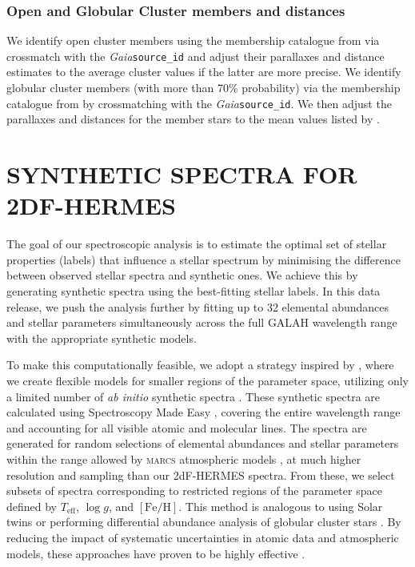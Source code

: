 \documentclass[
  journal=pasa,
  manuscript=research-paper, %
  year=2024,
  volume=37
]{cup-journal}
\newcommand{\Teff}{$T_\mathrm{eff}$\xspace}
\newcommand{\logg}{$\log g$\xspace}
\newcommand{\feh}{$\mathrm{[Fe/H]}$\xspace}
\newcommand{\sme}{\textsc{sme}\xspace}
\newcommand{\marcs}{\textsc{marcs}\xspace}
\newcommand{\Gaia}{\textit{Gaia}\xspace}
\begin{document}
\subsubsection{Open and Globular Cluster members and distances} \label{sec:oc_gc}

We identify open cluster members using the membership catalogue from \citet{CantatGaudin2020} via crossmatch with the \Gaia \texttt{source\_id} and adjust their parallaxes and distance estimates to the average cluster values if the latter are more precise. We identify globular cluster members (with more than 70\% probability) via the membership catalogue from \citet{Vasiliev2021} by crossmatching with the \Gaia \texttt{source\_id}. We then adjust the parallaxes and distances for the member stars to the mean values listed by \citet{Baumgardt2021}.

\section{SYNTHETIC SPECTRA FOR 2DF-HERMES}
\label{sec:synthetic_spectra}

The goal of our spectroscopic analysis is to estimate the optimal set of stellar properties (labels) that influence a stellar spectrum by minimising the difference between observed stellar spectra and synthetic ones. We achieve this by generating synthetic spectra using the best-fitting stellar labels. In this data release, we push the analysis further by fitting up to 32 elemental abundances and stellar parameters simultaneously across the full GALAH wavelength range with the appropriate synthetic models.

To make this computationally feasible, we adopt a strategy inspired by \citet{Rix2016}, where we create flexible models for smaller regions of the parameter space, utilizing only a limited number of \textit{ab initio} synthetic spectra \citep[see also][]{Ting2016b}. These synthetic spectra are calculated using Spectroscopy Made Easy \citep[\sme;][]{Valenti1996,Piskunov2017}, covering the entire wavelength range and accounting for all visible atomic and molecular lines. The spectra are generated for random selections of elemental abundances and stellar parameters within the range allowed by \marcs atmospheric models \citep{Gustafsson2008}, at much higher resolution and sampling than our 2dF-HERMES spectra. From these, we select subsets of spectra corresponding to restricted regions of the parameter space defined by \Teff, \logg, and \feh. This method is analogous to using Solar twins \citep[see, e.g.,][]{Nissen2015} or performing differential abundance analysis of globular cluster stars \citep[e.g.,][]{Yong2013, Monty2023}. By reducing the impact of systematic uncertainties in atomic data and atmospheric models, these approaches have proven to be highly effective \citep{Nissen2018}.
\end{document}
